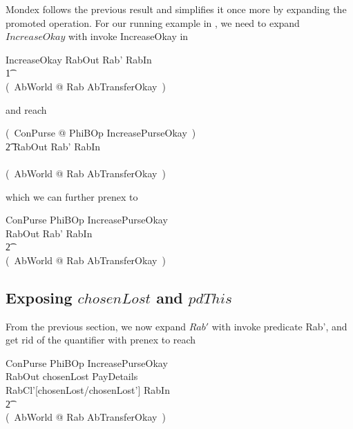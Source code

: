 Mondex follows the previous result and simplifies it once more by
expanding the promoted operation. For our running example in \zeves,
we need to expand $IncreaseOkay$ with \textsf{invoke IncreaseOkay} in
%
\begin{gzed}
  IncreaseOkay \land RabOut \land Rab' \land RabIn
  \\
  \t1 \implies
  \\
  (~\exists AbWorld @ Rab \land AbTransferOkay~)
\end{gzed}
%
and reach
%
\begin{gzed}
  (~\exists \Delta ConPurse @ PhiBOp \land IncreasePurseOkay~) \land
  \\ %
  \t2 RabOut \land Rab' \land RabIn
  \\ %
  \implies
  \\ %
  (~\exists AbWorld @ Rab \land AbTransferOkay~)
\end{gzed}
%
which we can further \textsf{prenex} to
%
\begin{gzed}
    \Delta ConPurse \land PhiBOp \land IncreasePurseOkay \\
    \land RabOut \land Rab' \land RabIn \\
 \t2 \implies \\
    (~\exists AbWorld @ Rab \land AbTransferOkay~)
\end{gzed}


\subsection{Exposing $chosenLost$ and $pdThis$}\label{ch14.exposing-pdthis}

From the previous section, we now expand $Rab'$ with \textsf{invoke predicate Rab'},
and get rid of the quantifier with \textsf{prenex} to reach
%
\begin{gzed}
     \Delta ConPurse \land PhiBOp \land IncreasePurseOkay \\
      \land RabOut \land chosenLost \in \power PayDetails \\
      \land RabCl'[chosenLost/chosenLost'] \land RabIn \\
\t2 \implies \\
    (~\exists AbWorld @ Rab \land AbTransferOkay~)
\end{gzed}

